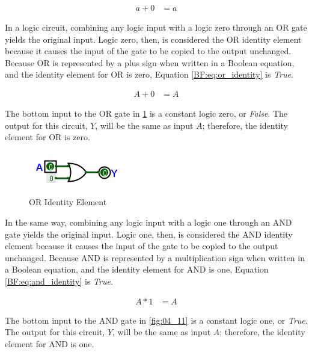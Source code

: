 \begin{align}
  \label{BF:eq:identity_element_of_addition}
  a + 0 &= a 
\end{align}

In a logic circuit, combining any logic input with a logic zero through an \textsf{OR}  gate yields the original input. Logic zero, then, is considered the \textsf{OR} identity element because it causes the input of the gate to be copied to the output unchanged. Because \textsf{OR}  is represented by a plus sign when written in a Boolean equation, and the identity element for \textsf{OR}  is zero, Equation \ref{BF:eq:or_identity} is \emph{True}.

\begin{align}
  \label{BF:eq:or_identity}
  A + 0 &= A 
\end{align}

The bottom input to the \textsf{OR} gate in \ref{fig:04_10} is a constant logic zero, or \emph{False}. The output for this circuit, $ Y $, will be the same as input $ A $; therefore, the identity element for \textsf{OR}  is zero.  

\begin{figure}[H]
	\centering
	\includegraphics[width=\maxwidth{.95\linewidth}]{gfx/04_10}
	\caption{OR Identity Element}
	\label{fig:04_10}
\end{figure}

In the same way, combining any logic input with a logic one through an \textsf{AND}  gate yields the original input. Logic one, then, is considered the \textsf{AND}  identity element because it causes the input of the gate to be copied to the output unchanged. Because \textsf{AND}  is represented by a multiplication sign when written in a Boolean equation, and the identity element for \textsf{AND} is one, Equation \ref{BF:eq:and_identity} is \emph{True}.

\begin{align}
  \label{BF:eq:and_identity}
  A * 1 &= A 
\end{align}

The bottom input to the \textsf{AND} gate in \ref{fig:04_11} is a constant logic one, or \emph{True}. The output for this circuit, $ Y $, will be the same as input $ A $; therefore, the identity element for \textsf{AND}  is one.  

